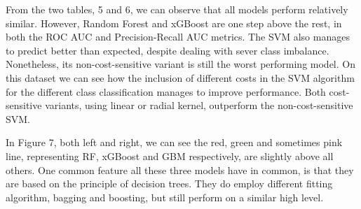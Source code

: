 \documentclass[12pt,]{article}
\begin{document}
\begin{table}

\caption{\label{tab:cr_card_model_PR}ULB Credit Card: PR Metric Model Variations}
\centering
{}
\end{table}

From the two tables, 5 and 6, we can observe that all models perform
relatively similar. However, Random Forest and xGBoost are one step
above the rest, in both the ROC AUC and Precision-Recall AUC metrics.
The SVM also manages to predict better than expected, despite dealing
with sever class imbalance. Nonetheless, its non-cost-sensitive variant
is still the worst performing model. On this dataset we can see how the
inclusion of different costs in the SVM algorithm for the different
class classification manages to improve performance. Both cost-sensitive
variants, using linear or radial kernel, outperform the
non-cost-sensitive SVM.

In Figure 7, both left and right, we can see the red, green and
sometimes pink line, representing RF, xGBoost and GBM respectively, are
slightly above all others. One common feature all these three models
have in common, is that they are based on the principle of decision
trees. They do employ different fitting algorithm, bagging and boosting,
but still perform on a similar high level.
\end{document}
